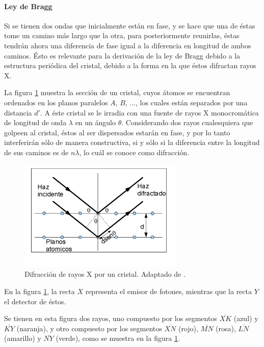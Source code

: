 \documentclass[../main.tex]{subfiles}
\begin{document}
\paragraph{Ley de Bragg}
Si se tienen dos ondas que inicialmente están en fase, y se hace que una de éstas tome un camino más largo que la otra, para posteriormente reunirlas, éstas tendrán ahora una diferencia de fase igual a la diferencia en longitud de ambos caminos. Ésto es relevante para la derivación de la ley de Bragg debido a la estructura periódica del cristal, debido a la forma en la que éstos difractan rayos X.

La figura \ref{fig:braggdiag} muestra la sección de un cristal, cuyos átomos se encuentran ordenados en los planos paralelos $A$, $B$, ..., los cuales están separados por una distancia $d'$. A éste cristal se le irradia con una fuente de rayos X monocromática de longitud de onda $\lambda$ en un ángulo $\theta$. Considerando dos rayos cualesquiera que golpeen al cristal, éstos al ser dispersados estarán en fase, y por lo tanto interferirán sólo de manera constructiva, si y sólo si la diferencia entre la longitud de sus caminos es de $n\lambda$, lo cuál se conoce como difracción.
\begin{figure}[H]
    \centering
    \includegraphics[width=0.7\textwidth]{fig/braggdiag.png}
    \caption{Difracción de rayos X por un cristal. Adaptado de \cite{Cullity2014}.}
    \label{fig:braggdiag}
\end{figure}
En la figura \ref{fig:braggdiag}, la recta $X$ representa el emisor de fotones, mientras que la recta $Y$ el detector de éstos.

Se tienen en esta figura dos rayos, uno compuesto por los segmentos $\overline{XK}$ (azul) y $\overline{KY}$ (naranja), y otro compuesto por los segmentos $\overline{XN}$ (rojo), $\overline{MN}$ (rosa), $\overline{LN}$ (amarillo) y $\overline{NY}$ (verde), como se muestra en la figura \ref{fig:braggdiag}.
\end{document}
